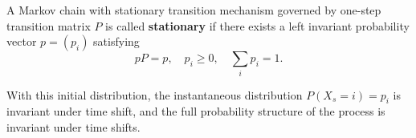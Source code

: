 A Markov chain with stationary transition mechanism governed by one-step transition matrix $P$ is called \textbf{stationary} if there exists a left invariant probability vector $p = (p_i)$ satisfying
$$pP = p, \quad p_i \geq 0, \quad \sum_i p_i = 1.$$

With this initial distribution, the instantaneous distribution $P(X_s = i) = p_i$ is invariant under time shift, and the full probability structure of the process is invariant under time shifts.
